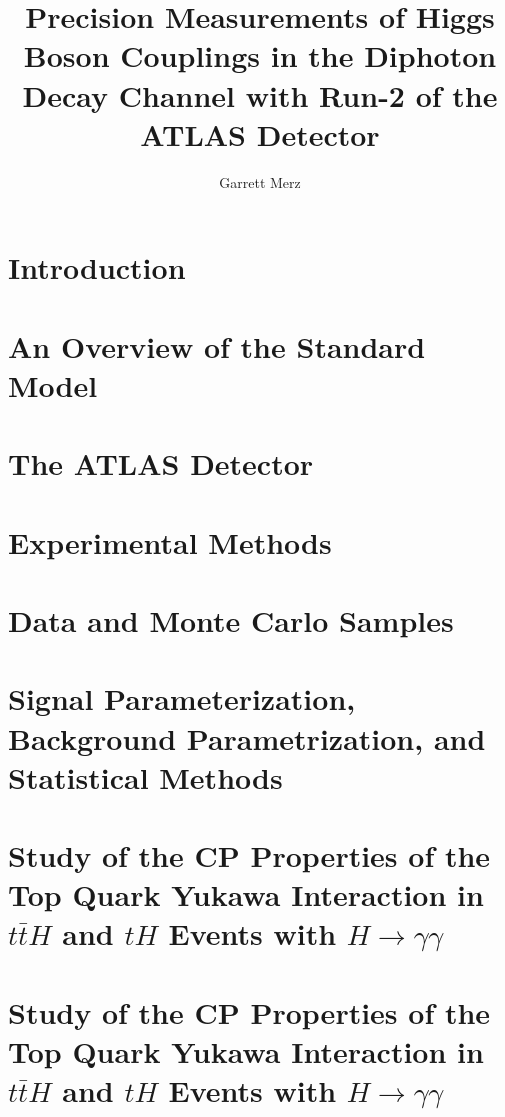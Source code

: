 \documentclass[thesis,openany]{./tex/thesis-umich}
\title{Precision Measurements of Higgs Boson Couplings in the Diphoton Decay Channel with Run-2 of the ATLAS Detector}
\author{Garrett Merz}
\begin{document}

\chapter{Introduction} \label{chap:intro}
	 

\chapter{An Overview of the Standard Model} \label{chap:theory_chapter}
	 

\chapter{The ATLAS Detector} \label{chap:detector_chapter}
	 

\chapter{Experimental Methods} \label{chap:methods_chapter}
	 

\chapter{Data and Monte Carlo Samples} \label{chap:datamc_chapter}
	 

\chapter{Signal Parameterization, Background Parametrization, and Statistical Methods} \label{chap:sigbkgparam}
	 

\chapter{Study of the CP Properties of the Top Quark Yukawa Interaction in $t\bar{t}H$ and $tH$ Events with $H \rightarrow \gamma \gamma$} \label{chap:tthcp_chapter}
	 

\chapter{Study of the CP Properties of the Top Quark Yukawa Interaction in $t\bar{t}H$ and $tH$ Events with $H \rightarrow \gamma \gamma$} \label{chap:tthcp_results}
	 
\end{document}
